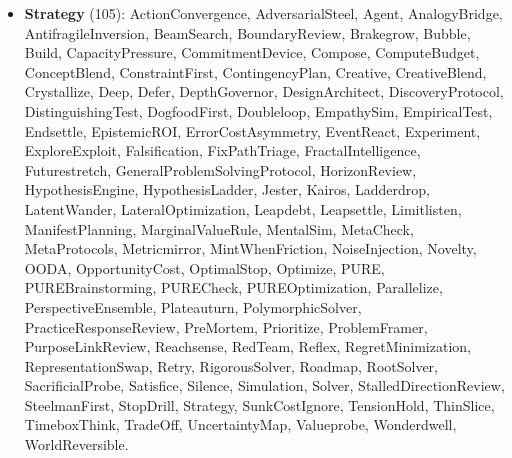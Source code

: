 \begin{itemize}
    \item \textbf{Strategy} (105): ActionConvergence, AdversarialSteel, Agent, AnalogyBridge, AntifragileInversion, BeamSearch, BoundaryReview, Brakegrow, Bubble, Build, CapacityPressure, CommitmentDevice, Compose, ComputeBudget, ConceptBlend, ConstraintFirst, ContingencyPlan, Creative, CreativeBlend, Crystallize, Deep, Defer, DepthGovernor, DesignArchitect, DiscoveryProtocol, DistinguishingTest, DogfoodFirst, Doubleloop, EmpathySim, EmpiricalTest, Endsettle, EpistemicROI, ErrorCostAsymmetry, EventReact, Experiment, ExploreExploit, Falsification, FixPathTriage, FractalIntelligence, Futurestretch, GeneralProblemSolvingProtocol, HorizonReview, HypothesisEngine, HypothesisLadder, Jester, Kairos, Ladderdrop, LatentWander, LateralOptimization, Leapdebt, Leapsettle, Limitlisten, ManifestPlanning, MarginalValueRule, MentalSim, MetaCheck, MetaProtocols, Metricmirror, MintWhenFriction, NoiseInjection, Novelty, OODA, OpportunityCost, OptimalStop, Optimize, PURE, PUREBrainstorming, PURECheck, PUREOptimization, Parallelize, PerspectiveEnsemble, Plateauturn, PolymorphicSolver, PracticeResponseReview, PreMortem, Prioritize, ProblemFramer, PurposeLinkReview, Reachsense, RedTeam, Reflex, RegretMinimization, RepresentationSwap, Retry, RigorousSolver, Roadmap, RootSolver, SacrificialProbe, Satisfice, Silence, Simulation, Solver, StalledDirectionReview, SteelmanFirst, StopDrill, Strategy, SunkCostIgnore, TensionHold, ThinSlice, TimeboxThink, TradeOff, UncertaintyMap, Valueprobe, Wonderdwell, WorldReversible.
\end{itemize}

